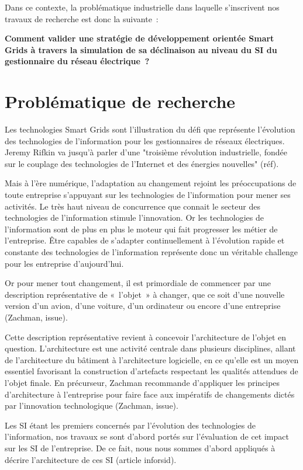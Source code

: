 Dans ce contexte, la problématique industrielle dans laquelle  s'inscrivent nos 
travaux de recherche est donc la suivante~: 

\textbf{Comment valider une stratégie de développement orientée Smart Grids à 
travers la simulation de sa déclinaison au niveau du SI du gestionnaire du 
réseau électrique~?}

 
\section{Problématique de recherche}

Les technologies Smart Grids sont l'illustration du défi que représente 
l'évolution des technologies de l'information pour les gestionnaires de réseaux 
électriques. Jeremy Rifkin va jusqu'à parler d'une "troisième révolution 
industrielle, fondée sur le couplage des technologies de l’Internet et des 
énergies nouvelles" (réf). 

Mais à l'ère numérique, l'adaptation au changement rejoint les préoccupations de 
toute entreprise s'appuyant sur les technologies de l'information pour mener ses 
activités. Le très haut niveau de concurrence que connait le secteur des 
technologies de l'information stimule l'innovation. Or les technologies de 
l'information sont de plus en plus le moteur qui fait progresser les  métier de 
l'entreprise. Être capables de s'adapter continuellement à l'évolution rapide et 
constante des technologies de l'information représente donc un véritable 
challenge pour les entreprise d'aujourd'hui. 

Or pour mener tout changement, il est primordiale de commencer par une 
description représentative de «~l'objet~» à changer, que ce soit d'une nouvelle 
version d'un avion, d'une voiture, d'un ordinateur ou encore d'une entreprise  
(Zachman, issue).

Cette description représentative revient à concevoir l'architecture de l'objet 
en question. L'architecture est une activité centrale dans plusieurs 
disciplines, allant de l'architecture du bâtiment à l'architecture logicielle, 
en ce qu'elle est un moyen essentiel favorisant la construction d'artefacts 
respectant les qualités attendues de l'objet finale. En précurseur, Zachman 
recommande d'appliquer les principes d'architecture à l'entreprise pour faire 
face aux impératifs de changements dictés par l'innovation technologique 
(Zachman, issue).

Les SI étant les premiers concernés par l'évolution des technologies de 
l'information, nos travaux se sont d'abord portés sur l'évaluation de cet impact 
sur les SI de l'entreprise. De ce fait, nous nous sommes d'abord appliqués à 
décrire l'architecture de ces SI (article inforsid). 

